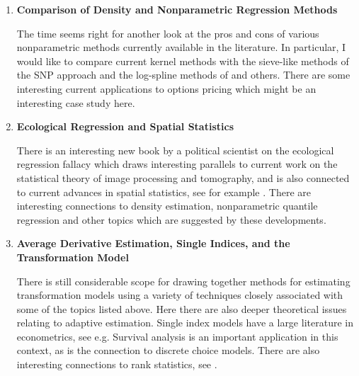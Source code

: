 \begin{enumerate}
\item{\bf Comparison of Density and Nonparametric Regression Methods}

The time seems right for another look at the pros and cons of various
nonparametric methods currently available in the literature.  In
particular, I would like to compare current kernel methods with the
sieve-like methods of the \cite{FG:1996,GT:1997} SNP approach and the
log-spline methods of \cite{SHKT} and others.  There are some interesting
current applications to options pricing which might be an interesting
case study here.


\item {\bf Ecological Regression and Spatial Statistics}

There is an interesting new book by a political scientist \cite{King}
on the ecological regression fallacy which draws interesting
parallels to current work on the statistical theory of image
processing and tomography, and is also connected to current advances
in spatial statistics, see for example \cite{Small}.
There are interesting connections to density estimation, nonparametric
quantile regression and other topics which are suggested by these
developments.

\item {\bf Average Derivative Estimation, Single Indices, 
and the Transformation Model}

There is still considerable scope for drawing together methods for
estimating transformation models using a variety of techniques 
closely associated with some of the topics listed above.  Here
there are also deeper theoretical issues relating to adaptive estimation.
Single index models have a large literature in econometrics, see e.g.
\cite{Stoker,cds:1997} 
Survival analysis is an important application in this context,
as is the connection to discrete choice models.
There are also interesting connections to rank statistics, see 
\cite{Han:1987,G:1997}.

\end{enumerate}




